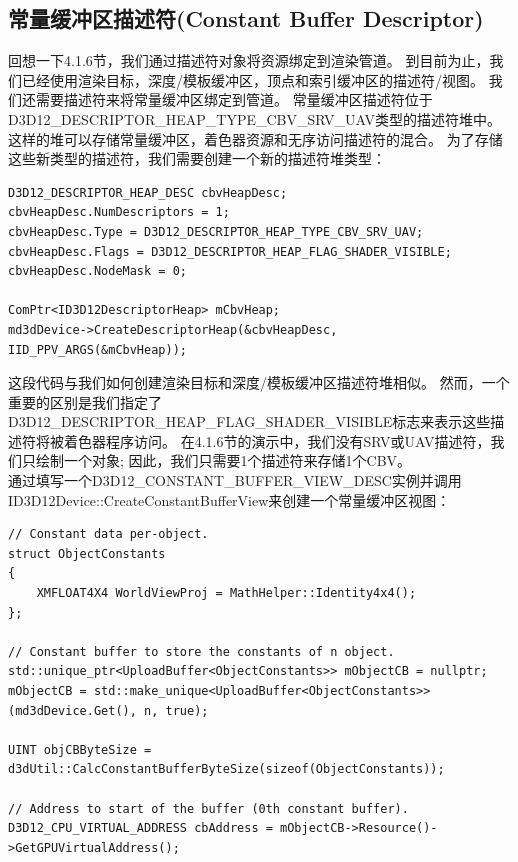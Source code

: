 \documentclass[11pt,a4paper,oldfontcommands]{memoir}
\begin{document}
{\subsection{常量缓冲区描述符(Constant Buffer Descriptor)}
\begin{flushleft}
回想一下4.1.6节，我们通过描述符对象将资源绑定到渲染管道。 到目前为止，我们已经使用渲染目标，深度/模板缓冲区，顶点和索引缓冲区的描述符/视图。 我们还需要描述符来将常量缓冲区绑定到管道。 常量缓冲区描述符位于D3D12\_DESCRIPTOR\_HEAP\_TYPE\_CBV\_SRV\_UAV类型的描述符堆中。 这样的堆可以存储常量缓冲区，着色器资源和无序访问描述符的混合。 为了存储这些新类型的描述符，我们需要创建一个新的描述符堆类型：\\
\end{flushleft}
\begin{lstlisting}
D3D12_DESCRIPTOR_HEAP_DESC cbvHeapDesc;
cbvHeapDesc.NumDescriptors = 1;
cbvHeapDesc.Type = D3D12_DESCRIPTOR_HEAP_TYPE_CBV_SRV_UAV;
cbvHeapDesc.Flags = D3D12_DESCRIPTOR_HEAP_FLAG_SHADER_VISIBLE;
cbvHeapDesc.NodeMask = 0;

ComPtr<ID3D12DescriptorHeap> mCbvHeap;
md3dDevice->CreateDescriptorHeap(&cbvHeapDesc, IID_PPV_ARGS(&mCbvHeap));
\end{lstlisting}
\begin{flushleft}
这段代码与我们如何创建渲染目标和深度/模板缓冲区描述符堆相似。 然而，一个重要的区别是我们指定了D3D12\_DESCRIPTOR\_HEAP\_FLAG\_SHADER\_VISIBLE标志来表示这些描述符将被着色器程序访问。 在4.1.6节的演示中，我们没有SRV或UAV描述符，我们只绘制一个对象; 因此，我们只需要1个描述符来存储1个CBV。\\
通过填写一个D3D12\_CONSTANT\_BUFFER\_VIEW\_DESC实例并调用ID3D12Device::CreateConstantBufferView来创建一个常量缓冲区视图：\\
\end{flushleft}
\begin{lstlisting}
// Constant data per-object.
struct ObjectConstants
{
    XMFLOAT4X4 WorldViewProj = MathHelper::Identity4x4();
};

// Constant buffer to store the constants of n object.
std::unique_ptr<UploadBuffer<ObjectConstants>> mObjectCB = nullptr;
mObjectCB = std::make_unique<UploadBuffer<ObjectConstants>>(md3dDevice.Get(), n, true);

UINT objCBByteSize = d3dUtil::CalcConstantBufferByteSize(sizeof(ObjectConstants));

// Address to start of the buffer (0th constant buffer).
D3D12_CPU_VIRTUAL_ADDRESS cbAddress = mObjectCB->Resource()->GetGPUVirtualAddress();


\end{lstlisting}}
\end{document}
